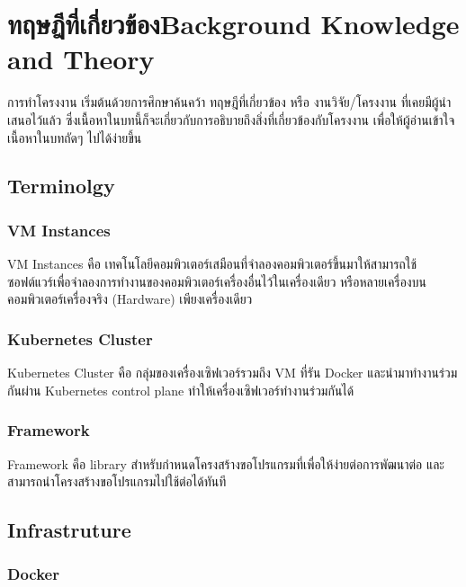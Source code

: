 \chapter{\ifcpe ทฤษฎีที่เกี่ยวข้อง\else Background Knowledge and Theory\fi}
\label{ch:background}

การทำโครงงาน เริ่มต้นด้วยการศึกษาค้นคว้า ทฤษฎีที่เกี่ยวข้อง หรือ งานวิจัย/โครงงาน ที่เคยมีผู้นำเสนอไว้แล้ว ซึ่งเนื้อหาในบทนี้ก็จะเกี่ยวกับการอธิบายถึงสิ่งที่เกี่ยวข้องกับโครงงาน เพื่อให้ผู้อ่านเข้าใจเนื้อหาในบทถัดๆ ไปได้ง่ายขึ้น

\section{Terminolgy}

\subsection{VM Instances}

VM Instances \cite{vm} คือ เทคโนโลยีคอมพิวเตอร์เสมือนที่จำลองคอมพิวเตอร์ขึ้นมาให้สามารถใช้ซอฟต์แวร์เพื่อจำลองการทำงานของคอมพิวเตอร์เครื่องอื่นไว้ในเครื่องเดียว หรือหลายเครื่องบนคอมพิวเตอร์เครื่องจริง (Hardware) เพียงเครื่องเดียว

\subsection{Kubernetes Cluster}

Kubernetes Cluster คือ กลุ่มของเครื่องเซิฟเวอร์รวมถึง VM ที่รัน Docker และนำมาทำงานร่วมกันผ่าน Kubernetes control plane \cite{kubecomp} ทำให้เครื่องเซิฟเวอร์ทำงานร่วมกันได้

\subsection{Framework}

Framework \cite{framework} คือ library สำหรับกำหนดโครงสร้างขอโปรแกรมที่เพื่อให้ง่ายต่อการพัฒนาต่อ และสามารถนำโครงสร้างขอโปรแกรมไปใช้ต่อได้ทันที

\section{Infrastruture}

\subsection{Docker}

